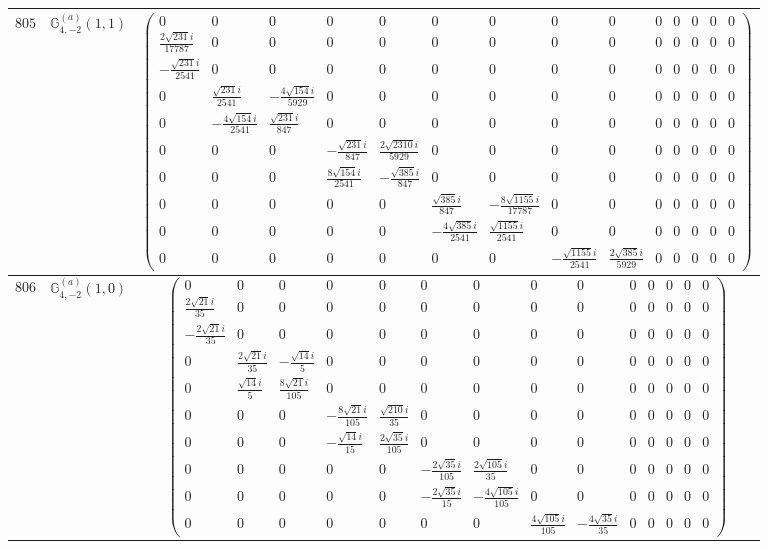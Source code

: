 \documentclass[fleqn,8pt,landscape]{jsarticle}
\begin{document}
\begin{center}
\begin{longtable}{ccc}
$ 805 $ & $ \mathbb{G}_{4,-2}^{(a)}(1,1) $ & $ \begin{pmatrix} 0 & 0 & 0 & 0 & 0 & 0 & 0 & 0 & 0 & 0 & 0 & 0 & 0 & 0 \\ \frac{2 \sqrt{231} i}{17787} & 0 & 0 & 0 & 0 & 0 & 0 & 0 & 0 & 0 & 0 & 0 & 0 & 0 \\ - \frac{\sqrt{231} i}{2541} & 0 & 0 & 0 & 0 & 0 & 0 & 0 & 0 & 0 & 0 & 0 & 0 & 0 \\ 0 & \frac{\sqrt{231} i}{2541} & - \frac{4 \sqrt{154} i}{5929} & 0 & 0 & 0 & 0 & 0 & 0 & 0 & 0 & 0 & 0 & 0 \\ 0 & - \frac{4 \sqrt{154} i}{2541} & \frac{\sqrt{231} i}{847} & 0 & 0 & 0 & 0 & 0 & 0 & 0 & 0 & 0 & 0 & 0 \\ 0 & 0 & 0 & - \frac{\sqrt{231} i}{847} & \frac{2 \sqrt{2310} i}{5929} & 0 & 0 & 0 & 0 & 0 & 0 & 0 & 0 & 0 \\ 0 & 0 & 0 & \frac{8 \sqrt{154} i}{2541} & - \frac{\sqrt{385} i}{847} & 0 & 0 & 0 & 0 & 0 & 0 & 0 & 0 & 0 \\ 0 & 0 & 0 & 0 & 0 & \frac{\sqrt{385} i}{847} & - \frac{8 \sqrt{1155} i}{17787} & 0 & 0 & 0 & 0 & 0 & 0 & 0 \\ 0 & 0 & 0 & 0 & 0 & - \frac{4 \sqrt{385} i}{2541} & \frac{\sqrt{1155} i}{2541} & 0 & 0 & 0 & 0 & 0 & 0 & 0 \\ 0 & 0 & 0 & 0 & 0 & 0 & 0 & - \frac{\sqrt{1155} i}{2541} & \frac{2 \sqrt{385} i}{5929} & 0 & 0 & 0 & 0 & 0 \end{pmatrix} $ \\ \hline
$ 806 $ & $ \mathbb{G}_{4,-2}^{(a)}(1,0) $ & $ \begin{pmatrix} 0 & 0 & 0 & 0 & 0 & 0 & 0 & 0 & 0 & 0 & 0 & 0 & 0 & 0 \\ \frac{2 \sqrt{21} i}{35} & 0 & 0 & 0 & 0 & 0 & 0 & 0 & 0 & 0 & 0 & 0 & 0 & 0 \\ - \frac{2 \sqrt{21} i}{35} & 0 & 0 & 0 & 0 & 0 & 0 & 0 & 0 & 0 & 0 & 0 & 0 & 0 \\ 0 & \frac{2 \sqrt{21} i}{35} & - \frac{\sqrt{14} i}{5} & 0 & 0 & 0 & 0 & 0 & 0 & 0 & 0 & 0 & 0 & 0 \\ 0 & \frac{\sqrt{14} i}{5} & \frac{8 \sqrt{21} i}{105} & 0 & 0 & 0 & 0 & 0 & 0 & 0 & 0 & 0 & 0 & 0 \\ 0 & 0 & 0 & - \frac{8 \sqrt{21} i}{105} & \frac{\sqrt{210} i}{35} & 0 & 0 & 0 & 0 & 0 & 0 & 0 & 0 & 0 \\ 0 & 0 & 0 & - \frac{\sqrt{14} i}{15} & \frac{2 \sqrt{35} i}{105} & 0 & 0 & 0 & 0 & 0 & 0 & 0 & 0 & 0 \\ 0 & 0 & 0 & 0 & 0 & - \frac{2 \sqrt{35} i}{105} & \frac{2 \sqrt{105} i}{35} & 0 & 0 & 0 & 0 & 0 & 0 & 0 \\ 0 & 0 & 0 & 0 & 0 & - \frac{2 \sqrt{35} i}{15} & - \frac{4 \sqrt{105} i}{105} & 0 & 0 & 0 & 0 & 0 & 0 & 0 \\ 0 & 0 & 0 & 0 & 0 & 0 & 0 & \frac{4 \sqrt{105} i}{105} & - \frac{4 \sqrt{35} i}{35} & 0 & 0 & 0 & 0 & 0 \end{pmatrix} $ \\ \hline

\end{longtable}
\end{center}
\end{document}
